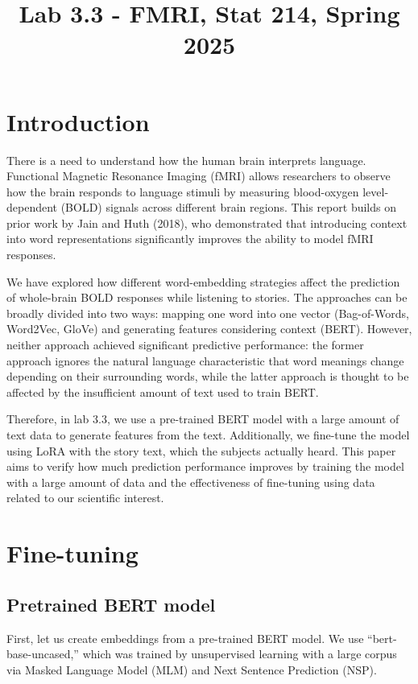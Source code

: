 \documentclass[12pt,letterpaper]{article}
\title{Lab 3.3 - FMRI, Stat 214, Spring 2025\vspace{-2em}}
\begin{document}
\maketitle


\section{Introduction}

There is a need to understand how the human brain interprets language. Functional Magnetic Resonance Imaging (fMRI) allows researchers to observe how the brain responds to language stimuli by measuring blood-oxygen level-dependent (BOLD) signals across different brain regions. This report builds on prior work by Jain and Huth (2018), who demonstrated that introducing context into word representations significantly improves the ability to model fMRI responses. 

We have explored how different word-embedding strategies affect the prediction of whole-brain BOLD responses while listening to stories. The approaches can be broadly divided into two ways: mapping one word into one vector (Bag-of-Words, Word2Vec, GloVe) and generating features considering context (BERT). However, neither approach achieved significant predictive performance: the former approach ignores the natural language characteristic that word meanings change depending on their surrounding words, while the latter approach is thought to be affected by the insufficient amount of text used to train BERT.

Therefore, in lab 3.3, we use a pre-trained BERT model with a large amount of text data to generate features from the text. Additionally, we fine-tune the model using LoRA with the story text, which the subjects actually heard. This paper aims to verify how much prediction performance improves by training the model with a large amount of data and the effectiveness of fine-tuning using data related to our scientific interest.


\section{Fine-tuning}
\subsection{Pretrained BERT model}
First, let us create embeddings from a pre-trained BERT model. We use “bert-base-uncased,” which was trained by unsupervised learning with a large corpus via Masked Language Model (MLM) and Next Sentence Prediction (NSP).
\end{document}
